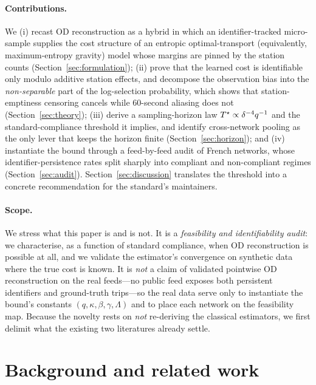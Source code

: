 \paragraph{Contributions.}
We (i) recast OD reconstruction as a hybrid in which an identifier-tracked
micro-sample supplies the cost structure of an entropic optimal-transport
(equivalently, maximum-entropy gravity) model whose margins are pinned by the
station counts (Section~\ref{sec:formulation}); (ii) prove that the learned cost
is identifiable only modulo additive station effects, and decompose the
observation bias into the \emph{non-separable} part of the log-selection
probability, which shows that station-emptiness censoring cancels while
60-second aliasing does not (Section~\ref{sec:theory}); (iii) derive a
sampling-horizon law $T^{\star} \propto \delta^{-4} q^{-1}$ and the
standard-compliance threshold it implies, and identify cross-network pooling as
the only lever that keeps the horizon finite (Section~\ref{sec:horizon}); and
(iv) instantiate the bound through a feed-by-feed audit of  French
networks, whose identifier-persistence rates split sharply into compliant and
non-compliant regimes (Section~\ref{sec:audit}). Section~\ref{sec:discussion}
translates the threshold into a concrete recommendation for the standard's
maintainers.

\paragraph{Scope.}
We stress what this paper is and is not. It is a \emph{feasibility and
identifiability audit}: we characterise, as a function of standard compliance,
when OD reconstruction is possible at all, and we validate the estimator's
convergence on synthetic data where the true cost is known. It is \emph{not} a
claim of validated pointwise OD reconstruction on the real feeds---no public feed
exposes both persistent identifiers and ground-truth trips---so the real data
serve only to instantiate the bound's constants $(q,\kappa,\beta,\gamma,\Lambda)$
and to place each network on the feasibility map. Because the novelty rests on
\emph{not} re-deriving the classical estimators, we first delimit what the
existing two literatures already settle.

\section{Background and related work}
\label{sec:related}

